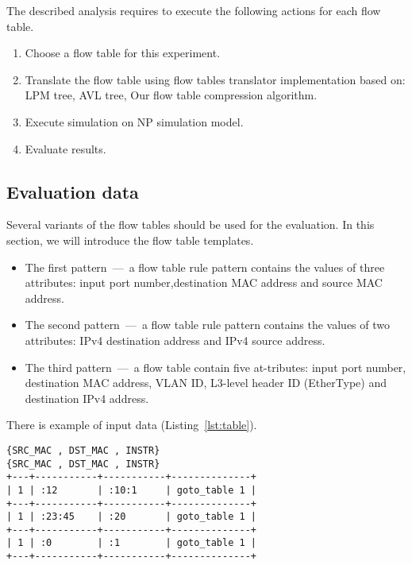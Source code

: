 \documentclass[conference]{IEEEtran}
\begin{document}
        The described analysis requires to execute the following actions for each flow table.

        \begin{enumerate}
            \item Choose a flow table for this experiment.
            \item Translate the flow table using flow tables translator implementation based on:
                LPM tree, AVL tree, Our flow table compression algorithm.
            \item Execute simulation on NP simulation model.
            \item Evaluate results.
        \end{enumerate}
        \subsection{Evaluation data}
            Several variants of the flow tables should be used for the evaluation. 
            In this section, we will introduce the flow table templates.
            \begin{itemize}
                \item The first pattern~---~a flow table rule pattern contains the values of three attributes: 
                    input port number,destination MAC address and source MAC address.
                \item The second pattern~---~a flow table rule pattern contains the values of two attributes: 
                    IPv4 destination address and IPv4 source address.
                \item The third pattern~---~a flow table contain five at-tributes: 
                    input port number, destination MAC address, VLAN ID, L3-level header ID (EtherType) and destination IPv4 address.
            \end{itemize}
            There is example of input data (Listing~\ref{lst:table}).
\begin{lstlisting}[float=htb,caption=Example of input data for input of a flow table,label=lst:table]
{SRC_MAC , DST_MAC , INSTR}
{SRC_MAC , DST_MAC , INSTR}
+---+-----------+-----------+--------------+
| 1 | :12       | :10:1     | goto_table 1 |
+---+-----------+-----------+--------------+
| 1 | :23:45    | :20       | goto_table 1 |
+---+-----------+-----------+--------------+
| 1 | :0        | :1        | goto_table 1 |
+---+-----------+-----------+--------------+
\end{lstlisting}
 
\end{document}
